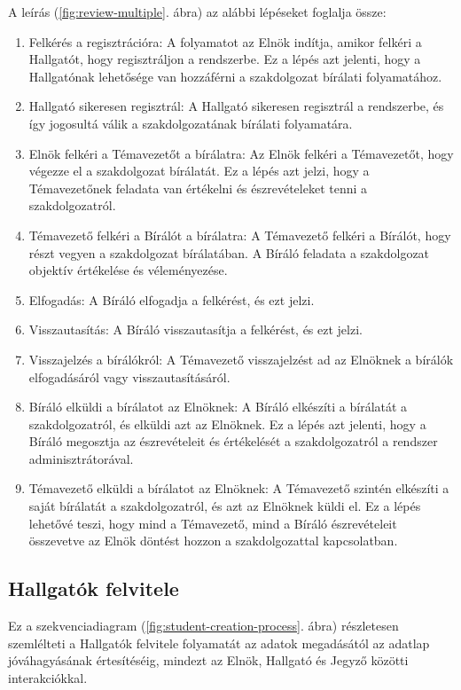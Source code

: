 \documentclass[a4paper,12pt]{article}
\begin{document}
A leírás (\ref{fig:review-multiple}. ábra) az alábbi lépéseket foglalja össze:
\begin{enumerate}
\item Felkérés a regisztrációra: A folyamatot az Elnök indítja, amikor felkéri a Hallgatót, hogy regisztráljon a rendszerbe. Ez a lépés azt jelenti, hogy a Hallgatónak lehetősége van hozzáférni a szakdolgozat bírálati folyamatához.
\item Hallgató sikeresen regisztrál: A Hallgató sikeresen regisztrál a rendszerbe, és így jogosultá válik a szakdolgozatának bírálati folyamatára.
\item Elnök felkéri a Témavezetőt a bírálatra: Az Elnök felkéri a Témavezetőt, hogy végezze el a szakdolgozat bírálatát. Ez a lépés azt jelzi, hogy a Témavezetőnek feladata van értékelni és észrevételeket tenni a szakdolgozatról.
\item Témavezető felkéri a Bírálót a bírálatra: A Témavezető felkéri a Bírálót, hogy részt vegyen a szakdolgozat bírálatában. A Bíráló feladata a szakdolgozat objektív értékelése és véleményezése.
\item Elfogadás: A Bíráló elfogadja a felkérést, és ezt jelzi.
\item Visszautasítás: A Bíráló visszautasítja a felkérést, és ezt jelzi.
\item Visszajelzés a bírálókról: A Témavezető visszajelzést ad az Elnöknek a bírálók elfogadásáról vagy visszautasításáról.
\item Bíráló elküldi a bírálatot az Elnöknek: A Bíráló elkészíti a bírálatát a szakdolgozatról, és elküldi azt az Elnöknek. Ez a lépés azt jelenti, hogy a Bíráló megosztja az észrevételeit és értékelését a szakdolgozatról a rendszer adminisztrátorával.
\item Témavezető elküldi a bírálatot az Elnöknek: A Témavezető szintén elkészíti a saját bírálatát a szakdolgozatról, és azt az Elnöknek küldi el. Ez a lépés lehetővé teszi, hogy mind a Témavezető, mind a Bíráló észrevételeit összevetve az Elnök döntést hozzon a szakdolgozattal kapcsolatban.
\end{enumerate}

\subsection{Hallgatók felvitele}

Ez a szekvenciadiagram (\ref{fig:student-creation-process}. ábra) részletesen szemlélteti a Hallgatók felvitele folyamatát az adatok megadásától az adatlap jóváhagyásának értesítéséig, mindezt az Elnök, Hallgató és Jegyző közötti interakciókkal.
\end{document}

